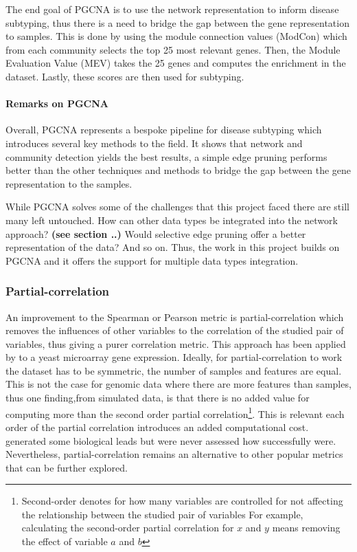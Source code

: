The end goal of PGCNA is to use the network representation to inform disease subtyping, thus there is a need to bridge the gap between the gene representation to samples. This is done by using the module connection values (ModCon) which from each community selects the top 25 most relevant genes. Then, the Module Evaluation Value (MEV) takes the 25 genes and computes the enrichment in the dataset. Lastly, these scores are then used for subtyping.

\paragraph*{Remarks on PGCNA}

Overall, PGCNA represents a bespoke pipeline for disease subtyping which introduces several key methods to the field. It shows that network and community detection yields the best results, a simple edge pruning performs better than the other techniques and methods to bridge the gap between the gene representation to the samples.

While PGCNA solves some of the challenges that this project faced there are still many left untouched. How can other data types be integrated into the network approach? \textbf{(see section ..)} Would selective edge pruning offer a better representation of the data? And so on. Thus, the work in this project builds on PGCNA and it offers the support for multiple data types integration.

\subsubsection{Partial-correlation} \label{s:lit:partial-corr}

An improvement to the Spearman or Pearson metric is partial-correlation which removes the influences of other variables to the correlation of the studied pair of variables, thus giving a purer correlation metric. This approach has been applied by \citet{De_la_Fuente2004-ts} to a yeast microarray gene expression. Ideally, for partial-correlation to work the dataset has to be symmetric, the number of samples and features are equal. This is not the case for genomic data where there are more features than samples, thus one finding,from simulated data, is that there is no added value for computing more than the second order partial correlation\footnote{Second-order denotes for how many variables are controlled for not affecting the relationship between the studied pair of variables For example, calculating the second-order partial correlation for $x$ and $y$ means removing the effect of variable $a$ and $b$}. This is relevant each order of the partial correlation introduces an added computational cost. \citet{De_la_Fuente2004-ts} generated some biological leads but were never assessed how successfully were. Nevertheless, partial-correlation remains an alternative to other popular metrics that can be further explored.

